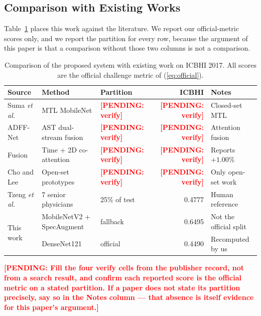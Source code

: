 \documentclass[journal,onecolumn]{IEEEtran}
\newcommand{\pending}[1]{\textcolor{red}{\textbf{[PENDING: #1]}}}
\begin{document}
\subsection{Comparison with Existing Works}
\label{subsec:comparison}

Table~\ref{tab:comparison} places this work against the literature. We report our
official-metric scores only, and we report the partition for every row, because the
argument of this paper is that a comparison without those two columns is not a
comparison.

\begin{table}[!t]
\centering
\caption{Comparison of the proposed system with existing work on ICBHI 2017. All
scores are the official challenge metric of (\ref{eq:official}).}
\label{tab:comparison}
\begin{tabular}{lllrl}
\toprule
Source & Method & Partition & ICBHI & Notes \\
\midrule
Suma \emph{et al.}~\cite{suma2025mtl}        & MTL MobileNet          & \pending{verify} & \pending{verify} & Closed-set MTL \\
ADFF-Net~\cite{adffnet2025}                  & AST dual-stream fusion & \pending{verify} & \pending{verify} & Attention fusion \\
Fusion~\cite{bspc2025fusion}                 & Time + 2D co-attention & \pending{verify} & \pending{verify} & Reports $+1.00\%$ \\
Cho and Lee~\cite{cho2025openset}            & Open-set prototypes    & \pending{verify} & \pending{verify} & Only open-set work \\
Tzeng \emph{et al.}~\cite{tzeng2025jmir}     & 7 senior physicians    & 25\% of test     & 0.4777 & Human reference \\
\midrule
\multirow{2}{*}{This work} & MobileNetV2 + SpecAugment & fallback  & 0.6495 & Not the official split \\
                           & DenseNet121               & official  & 0.4490 & Recomputed by us \\
\bottomrule
\end{tabular}

\vspace{2pt}
\footnotesize \pending{Fill the four verify cells from the publisher record, not from
a search result, and confirm each reported score is the official metric on a stated
partition. If a paper does not state its partition precisely, say so in the Notes
column --- that absence is itself evidence for this paper's argument.}
\end{table}
\end{document}
